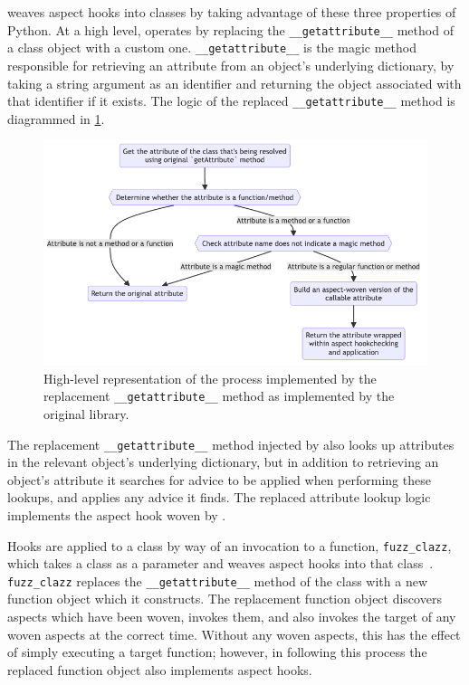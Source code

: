 \pdsf weaves aspect hooks into classes by taking advantage of these three
properties of Python. At a high level, \pdsf operates by replacing the
\lstinline{__getattribute__} method of a class object with a custom one.
\lstinline{__getattribute__} is the magic method responsible for retrieving an
attribute from an object's underlying dictionary, by taking a string argument as
an identifier and returning the object associated with that identifier if it
exists. The logic of the replaced \lstinline{__getattribute__} method is
diagrammed in \cref{fig:early_pdsf_replaced_getattr_diagram}.

\begin{figure}
\includegraphics[width=0.9\columnwidth]{30_prior_work/diagrams/replacement_getattr.png}
\caption{High-level representation of the process implemented by the replacement
\lstinline{__getattribute__} method as implemented by the original \pdsf{}
library.}
\label{fig:early_pdsf_replaced_getattr_diagram}
\end{figure}

The replacement \lstinline{__getattribute__} method injected by
\pdsf{} also looks up attributes in the relevant object's underlying dictionary,
but in addition to retrieving an object's attribute it searches for advice to be
applied when performing these lookups, and applies any advice it finds. The
replaced attribute lookup logic implements the aspect hook woven by \pdsf{}.

Hooks are applied to a class by way of an invocation to a function,
\lstinline{fuzz_clazz}, which takes a class as a parameter and weaves aspect
hooks into that class~\cite{pdsf_repo,asp_repo}. \lstinline{fuzz_clazz} replaces
the \lstinline{__getattribute__} method of the class with a new function
object which it constructs. The replacement function object discovers aspects
which have been woven, invokes them, and also invokes the target of any woven
aspects at the correct time. Without any woven aspects, this has the effect of
simply executing a target function; however, in following this process the
replaced function object also implements aspect hooks.

